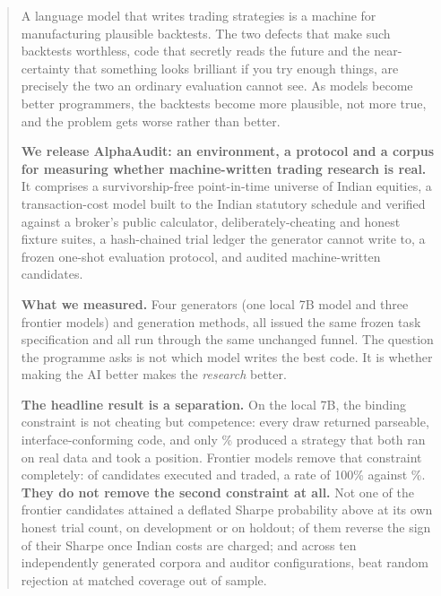\documentclass[11pt,a4paper]{article}
\begin{document}

\begin{abstract}
\noindent
A language model that writes trading strategies is a machine for manufacturing plausible
backtests. The two defects that make such backtests worthless, code that secretly reads the
future and the near-certainty that something looks brilliant if you try enough things, are
precisely the two an ordinary evaluation cannot see. As models become better programmers, the
backtests become more plausible, not more true, and the problem gets worse rather than better.

\medskip\noindent
\textbf{We release AlphaAudit: an environment, a protocol and a corpus for measuring whether
machine-written trading research is real.} It comprises a survivorship-free point-in-time
universe of Indian equities, a transaction-cost model built to the Indian statutory schedule and
verified against a broker's public calculator, deliberately-cheating and honest fixture suites, a
hash-chained trial ledger the generator cannot write to, a frozen one-shot evaluation protocol,
and \pgmParadigmDraws{} audited machine-written candidates.

\medskip\noindent
\textbf{What we measured.} Four generators (one local 7B model and three frontier models)
and \pgmParadigmArms{} generation methods, all issued the same frozen task specification and all
run through the same unchanged funnel. The question the programme asks is not which model writes
the best code. It is whether making the AI better makes the \emph{research} better.

\medskip\noindent
\textbf{The headline result is a separation.} On the local 7B, the binding constraint is not
cheating but competence: every draw returned parseable, interface-conforming code, and only
\pgmLocalTrade\% produced a strategy that both ran on real data and took a position. Frontier
models remove that constraint completely: \aaGvTotal{} of \aaGvTotal{} candidates executed and
traded, a rate of 100\% against \pgmLocalTrade\%. \textbf{They do not remove the second
constraint at all.} Not one of the \aaGvTotal{} frontier candidates attained a deflated Sharpe
probability above \aaGvBar{} at its own honest trial count, on development or on holdout;
\aaGvFlipsTotal{} of them reverse the sign of their Sharpe once Indian costs are charged; and
across ten independently generated corpora and \pgmNullCombos{} auditor configurations,
\pgmNullBeating{} beat random rejection at matched coverage out of sample.


\end{abstract}
\end{document}

